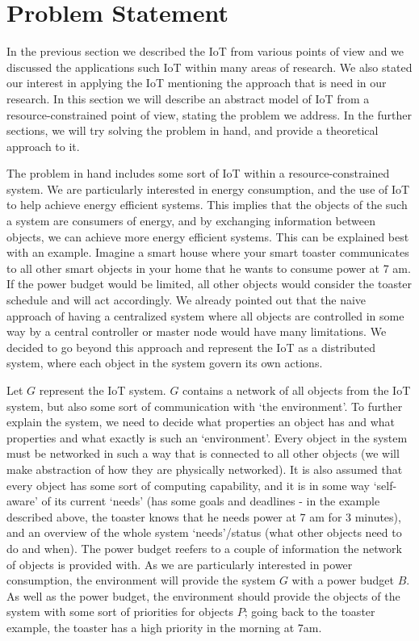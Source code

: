 \documentclass[../main/Self-Stabilization.tex]{subfiles}
\begin{document}
\section{Problem Statement}
In the previous section we described the IoT from various points of view and we discussed the applications such IoT within many areas of research. We also stated our interest in applying the IoT mentioning the approach that is need in our research. In this section we will describe an abstract model of IoT from a resource-constrained point of view, stating the problem we address. In the further sections, we will try solving the problem in hand, and provide a theoretical approach to it.

The problem in hand includes some sort of IoT within a resource-constrained system. We are particularly interested in energy consumption, and the use of IoT to help achieve energy efficient systems. This implies that the objects of the such a system are consumers of energy, and by exchanging information between objects, we can achieve more energy efficient systems. This can be explained best with an example. Imagine a smart house where your smart toaster communicates to all other smart objects in your home that he wants to consume power at 7 am. If the power budget would be limited, all other objects would consider the toaster schedule and will act accordingly. We already pointed out that the naive approach of having a centralized system where all objects are controlled in some way by a central controller or master node would have many limitations. We decided to go beyond this approach and represent the IoT as a distributed system, where each object in the system govern its own actions.

Let $G$ represent the IoT system. $G$ contains a network of all objects from the IoT system, but also some sort of communication with `the environment'. To further explain the system, we need to decide what properties an object has and what properties and what exactly is such an `environment'. Every object in the system must be networked in such a way that is connected to all other objects (we will make abstraction of how they are physically networked). It is also assumed that every object has some sort of computing capability, and it is in some way `self-aware' of its current `needs' (has some goals and deadlines - in the example described above, the toaster knows that he needs power at 7 am for 3 minutes), and an overview of the whole system `needs'/status (what other objects need to do and when). The power budget reefers to a couple of information the network of objects is provided with. As we are particularly interested in power consumption, the environment will provide the system $G$ with a power budget $B$. As well as the power budget, the environment should provide the objects of the system with some sort of priorities for objects $P$; going back to the toaster example, the toaster has a high priority in the morning at 7am. 
\end{document}
